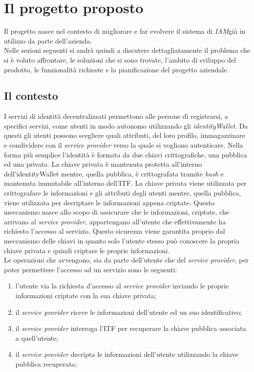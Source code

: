 \section{Il progetto proposto}
Il progetto nasce nel contesto di migliorare e far evolvere il sistema di \emph{\gls{IAM}}\glsfirstoccur già in utilizzo da parte dell'azienda.\\
Nelle sezioni seguenti si andrà quindi a discutere dettagliatamente il problema che si è voluto affrontare, le soluzioni che si sono trovate, l'ambito di sviluppo del prodotto, le funzionalità richieste e la pianificazione del progetto aziendale.

\subsection{Il contesto}
I servizi di identità decentralizzati permettono alle persone di registrarsi, a specifici servizi, come utenti in modo autonomo utilizzando gli \emph{\gls{identityWallet}}\glsfirstoccur. 
Da questi gli utenti possono scegliere quali attributi, del loro profilo, immagazzinare e condividere con il \textit{service provider} verso la quale si vogliono autenticare.
Nella forma più semplice l'identità è formata da due chiavi crittografiche, una pubblica ed una privata.
La chiave privata è mantenuta protetta all'interno dell'\gls{identityWallet} mentre, quella pubblica, è crittografata tramite \textit{hash} e mantenuta immutabile all'interno dell'\gls{ITF}. 
La chiave privata viene utilizzata per crittografare le informazioni e gli attributi degli utenti mentre, quella pubblica, viene utilizzata per decriptare le informazioni appena criptate. Questo meccanismo nasce allo scopo di assicurare che le informazioni, criptate, che arrivano al \textit{service provider}, appartengano all'utente che effettivamente ha richiesto l'accesso al servizio. Questo sicurezza viene garantita proprio dal meccanismo delle chiavi in quanto solo l'utente stesso può conoscere la propria chiave privata e quindi criptare le proprie informazioni.\\
Le operazioni che avvengono, sia da parte dell'utente che del \textit{service provider}, per poter permettere l'accesso ad un servizio sono le seguenti:
\begin{enumerate}
	\item l'utente via la richiesta d'accesso al \textit{service provider} inviando le proprie informazioni criptate con la sua chiave privata;
	\item il \textit{service provider} riceve le informazioni dell'utente ed un suo identificativo;
	\item il \textit{service provider} interroga l'\gls{ITF} per recuperare la chiave pubblica associata a quell'utente;
	\item il \textit{service provider} decripta le informazioni dell'utente utilizzando la chiave pubblica recuperata;
\end{enumerate}
